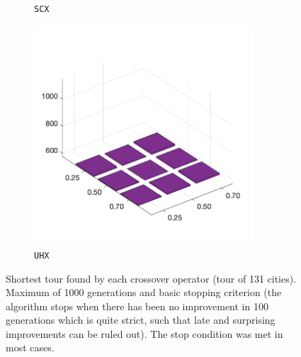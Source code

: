 \begin{figure}[H]
\begin{subfigure}[b]{0.25\textwidth}
		\caption{\texttt{SCX}}
		\label{fig:y}
    	\end{subfigure}
%
	\begin{subfigure}[b]{0.25\textwidth}
		\centering
		\includegraphics[width=0.9\textwidth]{crossover/min/cross_unnamed_4.png}
		\caption{\texttt{UHX}}
		\label{fig:z}
    	\end{subfigure}
	\caption{Shortest tour found by each crossover operator (tour of 131 cities). Maximum of 1000 generations and basic stopping criterion (the algorithm stops when there has been no improvement in 100 generations which is quite strict, such that late and surprising improvements can be ruled out). The stop condition was met in most cases.}
	\label{fig:rescross4}
\end{figure}

